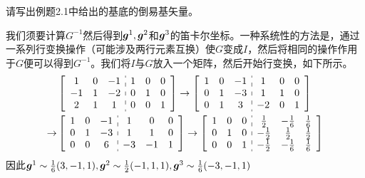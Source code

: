 \begin{example}
    请写出例题2.1中给出的基底的倒易基矢量。
\end{example}
\begin{solution}
    我们须要计算$G^{-1}$然后得到$\boldsymbol{g}^1,\boldsymbol{g}^2$和$\boldsymbol{g}^3$的笛卡尔坐标。一种系统性的方法是，通过一系列行变换操作（可能涉及两行元素互换）使$G$变成$I$，然后将相同的操作作用于$G$便可以得到$G^{-1}$。我们将$I$与$G$放入一个矩阵，然后开始行变换，如下所示。
    \begin{align*}
        &\left[ \begin{array}{ccc:ccc}
        1&		0&		-1&		1&		0&		0\\
        -1&		1&		-2&		0&		1&		0\\
        2&		1&		1&		0&		0&		1\\
    \end{array} \right] \rightarrow \left[ \begin{array}{ccc:ccc}
        1&		0&		-1&		1&		0&		0\\
        0&		1&		-3&		1&		1&		0\\
        0&		1&		3&		-2&		0&		1\\
    \end{array} \right]\\
        \rightarrow &\left[ \begin{array}{ccc:ccc}
        1&		0&		-1&		1&		0&		0\\
        0&		1&		-3&		1&		1&		0\\
        0&		0&		6&		-3&		-1&		1\\
    \end{array} \right] \rightarrow \left[ \begin{array}{ccc:ccc}
        1&		0&		0&		\frac{1}{2}&		-\frac{1}{6}&		\frac{1}{6}\\
        0&		1&		0&		-\frac{1}{2}&		\frac{1}{2}&		\frac{1}{2}\\
        0&		0&		1&		-\frac{1}{2}&		-\frac{1}{6}&		\frac{1}{6}\\
    \end{array} \right]\\
    \end{align*}
    因此$\boldsymbol{g}^1\sim \frac{1}{6}(3,-1,1),\boldsymbol{g}^2\sim \frac{1}{2}(-1,1,1),\boldsymbol{g}^3\sim \frac{1}{6}(-3,-1,1)$
\end{solution}



